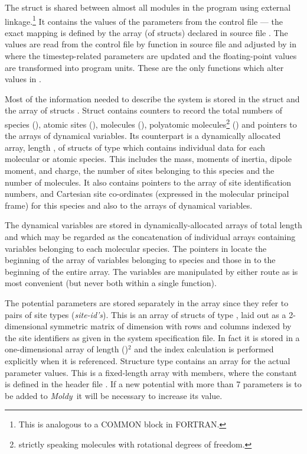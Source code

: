 \documentclass[a4paper,twoside]{report}
\newcommand{\moldy}{\emph{Moldy}}
\begin{document}
The struct  is shared between almost all modules in the
program using external linkage.\footnote{This is analogous to a COMMON
  block in FORTRAN.} It contains the values of the parameters from the
control file --- the exact mapping is defined by the array (of
structs)  declared in source file .  The
values are read from the control file by function
 in source file  and adjusted by
 in  where the timestep-related
parameters are updated and the floating-point values are transformed
into program units.  These are the only functions which alter values
in .

Most of the information needed to describe the system is stored in the
struct  and the array of structs .  Struct
 contains counters to record the total numbers of species
(), atomic sites (), molecules
(), polyatomic molecules\footnote{strictly speaking
  molecules with rotational degrees of freedom.} () and
pointers to the arrays of dynamical variables.  Its counterpart
 is a dynamically allocated array, length
, of structs of type  which
contains individual data for each molecular or atomic species.  This
includes the mass, moments of inertia, dipole moment, and charge, the
number of sites belonging to this species and the number of molecules.
It also contains pointers to the array of site identification numbers,
and Cartesian site co-ordinates (expressed in the molecular principal
frame) for this species and also to the arrays of dynamical variables.

The dynamical variables are stored in dynamically-allocated arrays of
total length  and  which may be regarded as
the concatenation of individual arrays containing variables belonging
to each molecular species. The pointers in 
locate the beginning of the array of variables belonging to species
 and those in  to the beginning of the entire
array.  The variables are manipulated by either route as is most
convenient (but never both within a single function).

The potential parameters are stored separately in the array
 since they refer to pairs of site types
(\emph{site-id's}).  This is an array of structs of type
, laid out as a 2-dimensional symmetric matrix of
dimension  with rows and columns indexed by the
site identifiers as given in the system specification file.  In fact
it is stored in a one-dimensional array of length
()$^2$ and the index calculation is performed
explicitly when it is referenced.  Structure type 
contains an array  for the actual parameter values.  This is
a fixed-length array with  members, where the constant
 is defined in the header file .  If a new
potential with more than 7 parameters is to be added to \moldy\ it
will be necessary to increase its value.  
\end{document}
